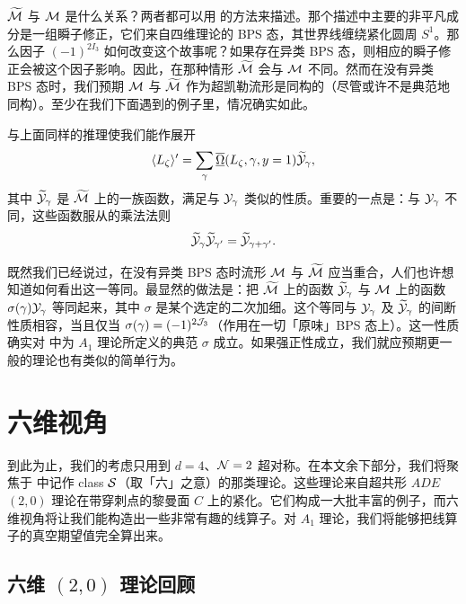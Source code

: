 $\widetilde{\cal M}$ 与 $\mathcal{M}$ 是什么关系？两者都可以用 \cite{Gaiotto:2008cd} 的方法来描述。那个描述中主要的非平凡成分是一组瞬子修正，它们来自四维理论的 BPS 态，其世界线缠绕紧化圆周 $S^1$。那么因子 $(-1)^{2 I_3}$ 如何改变这个故事呢？如果存在异类 BPS 态，则相应的瞬子修正会被这个因子影响。因此，在那种情形 $\widetilde{\cal M}$ 会与 $\mathcal{M}$ 不同。然而在没有异类 BPS 态时，我们预期 $\mathcal{M}$ 与 $\widetilde{\cal M}$ 作为超凯勒流形是同构的（尽管或许不是典范地同构）。至少在我们下面遇到的例子里，情况确实如此。

与上面同样的推理使我们能作展开
\begin{equation} \label{eq:y1}
\langle L_\zeta \rangle' = \sum_\gamma \overline{\underline{\Omega}}(L_\zeta, \gamma, y=1) \widetilde{\cal Y}_\gamma,
\end{equation}
其中 $\widetilde{\cal Y}_\gamma$ 是 $\widetilde{\cal M}$ 上的一族函数，满足与 $\mathcal{Y}_\gamma$ 类似的性质。重要的一点是：与 $\mathcal{Y}_\gamma$ 不同，这些函数服从的乘法法则
\begin{equation}
\widetilde{\cal Y}_{\gamma} \widetilde{\cal Y}_{\gamma'} = \widetilde{\cal Y}_{\gamma + \gamma'}.
\end{equation}

既然我们已经说过，在没有异类 BPS 态时流形 $\mathcal{M}$ 与 $\widetilde{\cal M}$ 应当重合，人们也许想知道如何看出这一等同。最显然的做法是：把 $\widetilde{\cal M}$ 上的函数 $\widetilde{\cal Y}_\gamma$ 与 $\mathcal{M}$ 上的函数 $\sigma(\gamma)\mathcal{Y}_\gamma$ 等同起来，其中 $\sigma$ 是某个选定的二次加细。这个等同与 $\mathcal{Y}_\gamma$ 及 $\widetilde{\cal Y}_\gamma$ 的间断性质相容，当且仅当 $\sigma(\gamma)=(-1)^{2 \mathcal{J}_3}$（作用在一切「原味」BPS 态上）。这一性质确实对 \cite{Gaiotto:2009hg} 中为 $A_1$ 理论所定义的典范 $\sigma$ 成立。如果强正性成立，我们就应预期更一般的理论也有类似的简单行为。


\section{六维视角}\label{sec:Six-Dim-View}

到此为止，我们的考虑只用到 $d=4$、$\mathcal{N}=2$ 超对称。在本文余下部分，我们将聚焦于 \cite{Gaiotto:2009hg} 中记作 class $\mathcal{S}$（取「六」之意）的那类理论。这些理论来自超共形 $ADE$ $(2,0)$ 理论在带穿刺点的黎曼面 $C$ 上的紧化。它们构成一大批丰富的例子，而六维视角将让我们能构造出一些非常有趣的线算子。对 $A_1$ 理论，我们将能够把线算子的真空期望值完全算出来。


\subsection{六维 $(2,0)$ 理论回顾}\label{subsec:6d-review}

